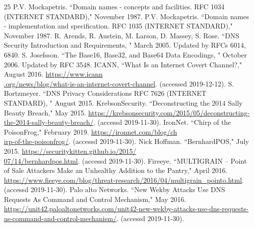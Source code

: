 \documentclass[12pt]{jarticle} %
\begin{document}
\newpage
%
\begin{thebibliography} {25}\small
  P.V. Mockapetris. ``Domain names - concepts and facilities. RFC 1034 (INTERNET STANDARD)," November 1987.
  P.V. Mockapetris. ``Domain names - implementation and specification. RFC 1035 (INTERNET STANDARD)," November 1987.
  R. Arends, R. Austein, M. Larson, D. Massey, S. Rose. ``DNS Security Introduction and Requirements, " March 2005. Updated by RFCs 6014, 6840.
  S. Josefsson. ``The Base16, Base32, and Base64 Data Encodings, " October 2006. Updated by RFC 3548.
  ICANN, ``What Is an Internet Covert Channel?," August 2016. \href{https://www.icann.org/news/blog/what-is-an-internet-covert-channel}{https://www.icann\\.org/news/blog/what-is-an-internet-covert-channel}. (accessed 2019-12-12).
  S. Bortzmeyer. ``DNS Privacy Considerations RFC 7626 (INTERNET STANDARD), " August 2015.
  KrebsonSecurity. ``Deconstructing the 2014 Sally Beauty Breach," May 2015. \href{https://krebsonsecurity.com/2015/05/deconstructing-the-2014-sally-beauty-breach/}{https://krebsonsecurity.com/2015/05/deconstructing-the-2014-sally-beauty-breach/}. (accessd 2019-11-30).
  IronNet. ``Chirp of the PoisonFrog," February 2019. \href{https://ironnet.com/blog/chirp-of-the-poisonfrog/}{https://ironnet.com/blog/ch\\irp-of-the-poisonfrog/}. (accessd 2019-11-30).
  Nick Hoffman. ``BernhardPOS," July 2015. \href{https://securitykitten.github.io/2015/07/14/bernhardpos.html}{https://securitykitten.github.io/2015/\\07/14/bernhardpos.html}. (accessd 2019-11-30).
  Fireeye. ``MULTIGRAIN – Point of Sale Attackers Make an Unhealthy Addition to the Pantry," April 2016. \href{https://www.fieeye.com/blog/threat-research/2016/04/multigrain\_pointo.html}{https://www.fieeye.com/blog/threat-research/2016/04/multigrain\_pointo.html}. (accessd 2019-11-30).
  Palo alto Networks. ``New Wekby Attacks Use DNS Requests As Command and Control Mechanism," May 2016. \href{https://unit42.paloaltonetworks.com/unit42-new-wekby-attacks-use-dns-requests-as-command-and-control-mechanism/}{https://unit42.paloaltonetworks.com/unit42-new-wekby-attacks-use-dns-requests-as-command-and-control-mechanism/}. (accessd 2019-11-30).

\end{thebibliography}
\end{document}
